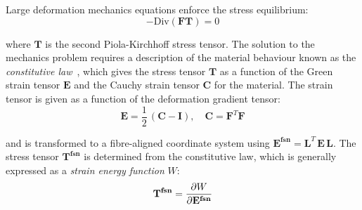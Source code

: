 \noindent
Large deformation mechanics equations enforce the stress equilibrium:
%
\begin{equation}
    -\text{Div}(\mathbf{F}\mathbf{T}) = 0
\end{equation}

\noindent
where $\mathbf{T}$ is the second Piola-Kirchhoff stress tensor. The solution to the mechanics problem requires a description of the material behaviour known as the \textit{constitutive law}~\cite{BonetWood:2008}, which gives the stress tensor $\mathbf{T}$ as a function of the Green strain tensor $\mathbf{E}$ and the Cauchy strain tensor $\mathbf{C}$ for the material. The strain tensor is given as a function of the deformation gradient tensor:
%
\begin{equation}
    \mathbf{E} = \frac{1}{2}\,(\mathbf{C}-\mathbf{I}),\quad \mathbf{C}=\mathbf{F}^T\mathbf{F}
\end{equation}

\noindent
and is transformed to a fibre-aligned coordinate system using $\mathbf{E^{fsn}}=\mathbf{L}^T\,\mathbf{E}\,\mathbf{L}$. The stress tensor $\mathbf{T^{fsn}}$ is determined from the constitutive law, which is generally expressed as a \textit{strain energy function} $W$:
%
\begin{equation}
    \mathbf{T^{fsn}} = \dfrac{\partial {W}}{\partial {\mathbf{E^{fsn}}}}
\end{equation}






